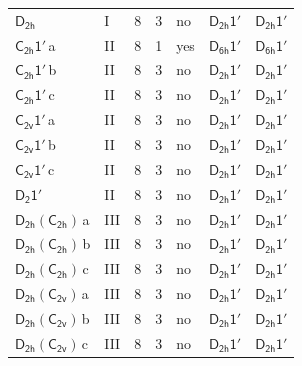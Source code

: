 \documentclass[10pt,a4paper]{article}
\numberwithin{equation}{section}
\newcommand{\grp}[1]{\mathsf{#1}}
\newcommand{\clsletter}[1]{\,{\scriptsize\color{black!55}#1}}
\begin{document}
{\begin{longtable}{@{}llrrlll@{}}
\href{../../../rotation/data/pdf/D2h.pdf}{$\grp{D_{2h}}$} & I & 8 & 3 & no & \href{D2h-1p.pdf}{$\grp{D_{2h}1'}$} & \href{D2h-1p.pdf}{$\grp{D_{2h}1'}$}\\
\href{C2h-1p.pdf}{$\grp{C_{2h}1'}$}\clsletter{a} & II & 8 & 1 & yes & \href{D6h-1p.pdf}{$\grp{D_{6h}1'}$} & \href{D6h-1p.pdf}{$\grp{D_{6h}1'}$}\\
\href{C2h-1p.pdf}{$\grp{C_{2h}1'}$}\clsletter{b} & II & 8 & 3 & no & \href{D2h-1p.pdf}{$\grp{D_{2h}1'}$} & \href{D2h-1p.pdf}{$\grp{D_{2h}1'}$}\\
\href{C2h-1p.pdf}{$\grp{C_{2h}1'}$}\clsletter{c} & II & 8 & 3 & no & \href{D2h-1p.pdf}{$\grp{D_{2h}1'}$} & \href{D2h-1p.pdf}{$\grp{D_{2h}1'}$}\\
\href{C2v-1p.pdf}{$\grp{C_{2v}1'}$}\clsletter{a} & II & 8 & 3 & no & \href{D2h-1p.pdf}{$\grp{D_{2h}1'}$} & \href{D2h-1p.pdf}{$\grp{D_{2h}1'}$}\\
\href{C2v-1p.pdf}{$\grp{C_{2v}1'}$}\clsletter{b} & II & 8 & 3 & no & \href{D2h-1p.pdf}{$\grp{D_{2h}1'}$} & \href{D2h-1p.pdf}{$\grp{D_{2h}1'}$}\\
\href{C2v-1p.pdf}{$\grp{C_{2v}1'}$}\clsletter{c} & II & 8 & 3 & no & \href{D2h-1p.pdf}{$\grp{D_{2h}1'}$} & \href{D2h-1p.pdf}{$\grp{D_{2h}1'}$}\\
\href{D2-1p.pdf}{$\grp{D_{2}1'}$} & II & 8 & 3 & no & \href{D2h-1p.pdf}{$\grp{D_{2h}1'}$} & \href{D2h-1p.pdf}{$\grp{D_{2h}1'}$}\\
\href{D2h-C2h.pdf}{$\grp{D_{2h}}(\grp{C_{2h}})$}\clsletter{a} & III & 8 & 3 & no & \href{D2h-1p.pdf}{$\grp{D_{2h}1'}$} & \href{D2h-1p.pdf}{$\grp{D_{2h}1'}$}\\
\href{D2h-C2h.pdf}{$\grp{D_{2h}}(\grp{C_{2h}})$}\clsletter{b} & III & 8 & 3 & no & \href{D2h-1p.pdf}{$\grp{D_{2h}1'}$} & \href{D2h-1p.pdf}{$\grp{D_{2h}1'}$}\\
\href{D2h-C2h.pdf}{$\grp{D_{2h}}(\grp{C_{2h}})$}\clsletter{c} & III & 8 & 3 & no & \href{D2h-1p.pdf}{$\grp{D_{2h}1'}$} & \href{D2h-1p.pdf}{$\grp{D_{2h}1'}$}\\
\href{D2h-C2v.pdf}{$\grp{D_{2h}}(\grp{C_{2v}})$}\clsletter{a} & III & 8 & 3 & no & \href{D2h-1p.pdf}{$\grp{D_{2h}1'}$} & \href{D2h-1p.pdf}{$\grp{D_{2h}1'}$}\\
\href{D2h-C2v.pdf}{$\grp{D_{2h}}(\grp{C_{2v}})$}\clsletter{b} & III & 8 & 3 & no & \href{D2h-1p.pdf}{$\grp{D_{2h}1'}$} & \href{D2h-1p.pdf}{$\grp{D_{2h}1'}$}\\
\href{D2h-C2v.pdf}{$\grp{D_{2h}}(\grp{C_{2v}})$}\clsletter{c} & III & 8 & 3 & no & \href{D2h-1p.pdf}{$\grp{D_{2h}1'}$} & \href{D2h-1p.pdf}{$\grp{D_{2h}1'}$}\\

\end{longtable}}
\end{document}
